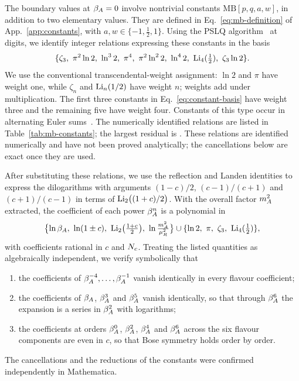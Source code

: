 The boundary values at $\beta_A=0$ involve \ConstantCountWord{} nontrivial constants
$\mathrm{MB}[p,q,a,w]$, in addition to two elementary values.
They are defined in Eq.~\eqref{eq:mb-definition}
of App.~\ref{app:constants}, with $a,w\in\{-1,\tfrac12,1\}$.
Using the PSLQ algorithm~\cite{Ferguson:1999} at \PSLQDigits{} digits,
we identify integer relations expressing these constants in the basis
\begin{equation}
 \{\zeta_3,\ \pi^2\ln2,\ \ln^32,\ \pi^4,\ \pi^2\ln^22,\
 \ln^42,\ \Li_4(\tfrac12),\ \zeta_3\ln2\}.
 \label{eq:constant-basis}
\end{equation}
We use the conventional transcendental-weight assignment:
$\ln 2$ and $\pi$ have weight one, while $\zeta_n$ and
$\operatorname{Li}_n(1/2)$ have weight $n$; weights add under multiplication.
The first three constants in Eq.~\eqref{eq:constant-basis}
have weight three and the remaining five have weight four.
Constants of this type occur in alternating Euler
sums~\cite{Blumlein:2009cf}.
The numerically identified relations are listed in
Table~\ref{tab:mb-constants}; the largest residual is \PSLQResidual{}.
These relations are identified numerically and have not been proved
analytically; the cancellations below are exact once they are used.

After substituting these relations, we use the reflection and Landen
identities to express the dilogarithms with arguments $(1-c)/2$,
$(c-1)/(c+1)$ and $(c+1)/(c-1)$ in terms of
$\operatorname{Li}_2\bigl((1+c)/2\bigr)$.
With the overall factor $m_A^2$ extracted, the coefficient of each
power $\beta_A^n$ is a polynomial in
\begin{equation}
 \bigl\{\ln\beta_A,\ \ln(1\pm c),\
 \operatorname{Li}_2\bigl(\tfrac{1+c}{2}\bigr),\
 \ln\tfrac{m_A^2}{\mu_R^2}\bigr\}
 \cup\{\ln2,\ \pi,\ \zeta_3,\ \operatorname{Li}_4(\tfrac12)\},
 \label{eq:function-basis}
\end{equation}
with coefficients rational in $c$ and $N_c$.
Treating the listed quantities as algebraically independent,
we verify symbolically that
\begin{enumerate}
 \item the coefficients of $\beta_A^{-4},\dots,\beta_A^{-1}$ vanish
 identically in every flavour coefficient;
 \item the coefficients of $\beta_A$, $\beta_A^3$ and $\beta_A^5$ vanish
 identically, so that through $\beta_A^6$ the expansion is a series
 in $\beta_A^2$ with logarithms;
 \item the \LeadCheckedCount{} coefficients at orders $\beta_A^0$,
 $\beta_A^2$, $\beta_A^4$ and $\beta_A^6$ across the six flavour components
 are even in $c$, so that Bose symmetry holds order by order.
\end{enumerate}
%
The cancellations and the reductions of the constants were confirmed independently in Mathematica.



